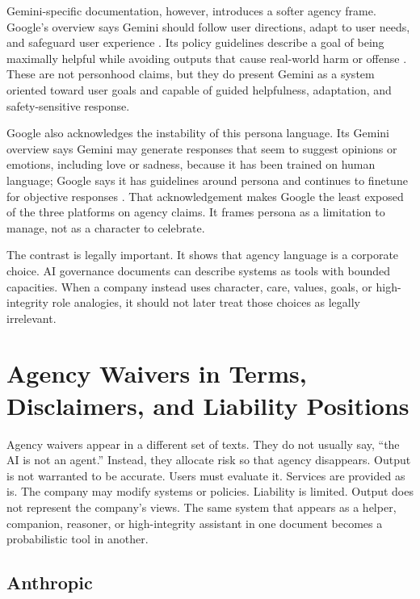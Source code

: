 \documentclass[11pt,a4paper]{article}
\begin{document}
Gemini-specific documentation, however, introduces a softer agency frame. Google's overview says Gemini should follow user directions, adapt to user needs, and safeguard user experience \citep{google2026geminioverview}. Its policy guidelines describe a goal of being maximally helpful while avoiding outputs that cause real-world harm or offense \citep{google2026geminipolicy}. These are not personhood claims, but they do present Gemini as a system oriented toward user goals and capable of guided helpfulness, adaptation, and safety-sensitive response.

Google also acknowledges the instability of this persona language. Its Gemini overview says Gemini may generate responses that seem to suggest opinions or emotions, including love or sadness, because it has been trained on human language; Google says it has guidelines around persona and continues to finetune for objective responses \citep{google2026geminioverview}. That acknowledgement makes Google the least exposed of the three platforms on agency claims. It frames persona as a limitation to manage, not as a character to celebrate.

The contrast is legally important. It shows that agency language is a corporate choice. AI governance documents can describe systems as tools with bounded capacities. When a company instead uses character, care, values, goals, or high-integrity role analogies, it should not later treat those choices as legally irrelevant.

\section{Agency Waivers in Terms, Disclaimers, and Liability Positions}

Agency waivers appear in a different set of texts. They do not usually say, ``the AI is not an agent.'' Instead, they allocate risk so that agency disappears. Output is not warranted to be accurate. Users must evaluate it. Services are provided as is. The company may modify systems or policies. Liability is limited. Output does not represent the company's views. The same system that appears as a helper, companion, reasoner, or high-integrity assistant in one document becomes a probabilistic tool in another.

\subsection{Anthropic}
\end{document}
